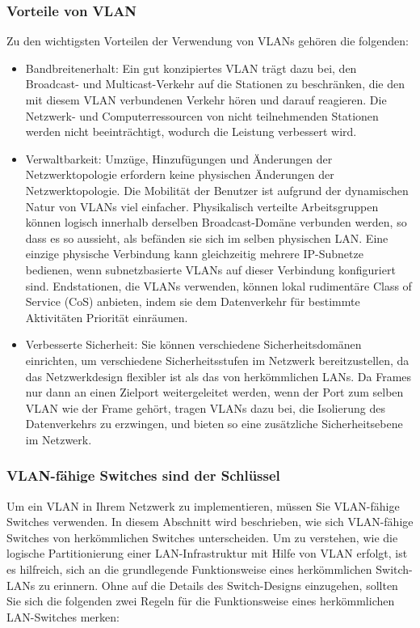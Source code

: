         \subsubsection{Vorteile von VLAN}

        Zu den wichtigsten Vorteilen der Verwendung von VLANs gehören die folgenden:
        \begin{itemize}
            \item Bandbreitenerhalt: Ein gut konzipiertes VLAN trägt dazu bei, den Broadcast- und Multicast-Verkehr auf die Stationen zu beschränken, die den mit diesem VLAN verbundenen Verkehr hören und darauf reagieren. Die Netzwerk- und Computerressourcen von nicht teilnehmenden Stationen werden nicht beeinträchtigt, wodurch die Leistung verbessert wird.
            \item Verwaltbarkeit: Umzüge, Hinzufügungen und Änderungen der Netzwerktopologie erfordern keine physischen Änderungen der Netzwerktopologie. Die Mobilität der Benutzer ist aufgrund der dynamischen Natur von VLANs viel einfacher. Physikalisch verteilte Arbeitsgruppen können logisch innerhalb derselben Broadcast-Domäne verbunden werden, so dass es so aussieht, als befänden sie sich im selben physischen LAN. Eine einzige physische Verbindung kann gleichzeitig mehrere IP-Subnetze bedienen, wenn subnetzbasierte VLANs auf dieser Verbindung konfiguriert sind. Endstationen, die VLANs verwenden, können lokal rudimentäre Class of Service (CoS) anbieten, indem sie dem Datenverkehr für bestimmte Aktivitäten Priorität einräumen.
            \item Verbesserte Sicherheit: Sie können verschiedene Sicherheitsdomänen einrichten, um verschiedene Sicherheitsstufen im Netzwerk bereitzustellen, da das Netzwerkdesign flexibler ist als das von herkömmlichen LANs. Da Frames nur dann an einen Zielport weitergeleitet werden, wenn der Port zum selben VLAN wie der Frame gehört, tragen VLANs dazu bei, die Isolierung des Datenverkehrs zu erzwingen, und bieten so eine zusätzliche Sicherheitsebene im Netzwerk.
        \end{itemize}

        \subsubsection{VLAN-fähige Switches sind der Schlüssel}

        Um ein VLAN in Ihrem Netzwerk zu implementieren, müssen Sie VLAN-fähige Switches verwenden. In diesem Abschnitt wird beschrieben, wie sich VLAN-fähige Switches von herkömmlichen Switches unterscheiden.
        Um zu verstehen, wie die logische Partitionierung einer LAN-Infrastruktur mit Hilfe von VLAN erfolgt, ist es hilfreich, sich an die grundlegende Funktionsweise eines herkömmlichen Switch-LANs zu erinnern. 
        Ohne auf die Details des Switch-Designs einzugehen, sollten Sie sich die folgenden zwei Regeln für die Funktionsweise eines herkömmlichen LAN-Switches merken:

